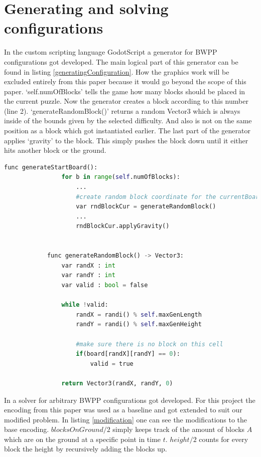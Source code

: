 \documentclass[runningheads]{llncs}
\begin{document}
    \section{Generating and solving configurations}
        In the custom scripting language GodotScript a generator for BWPP configurations got developed.
        The main logical part of this generator can be found in listing \ref{generatingConfiguration}.
        How the graphics work will be excluded entirely from this paper because it would go beyond the scope of this paper. \newline
        `self.numOfBlocks' tells the game how many blocks should be placed in the current puzzle. 
        Now the generator creates a block according to this number (line 2).
        `generateRandomBlock()' returns a random Vector3 which is always inside of the bounds given by the selected difficulty.
        And also is not on the same position as a block which got instantiated earlier.\newline
        The last part of the generator applies `gravity' to the block.
        This simply pushes the block down until it either hits another block or the ground.

        \begin{lstlisting}[caption=Generating configuration, label=generatingConfiguration, language=python]
            func generateStartBoard():   
                for b in range(self.numOfBlocks):
                    ... 
                    #create random block coordinate for the currentBoard
                    var rndBlockCur = generateRandomBlock() 
                    ...
                    rndBlockCur.applyGravity()


            func generateRandomBlock() -> Vector3:
                var randX : int
                var randY : int
                var valid : bool = false

                while !valid:
                    randX = randi() % self.maxGenLength
                    randY = randi() % self.maxGenHeight
                    
                    #make sure there is no block on this cell
                    if(board[randX][randY] == 0):
                        valid = true

                return Vector3(randX, randY, 0)
        \end{lstlisting}
           
        In \cite{originalEncodingPaper} a solver for arbitrary BWPP configurations got developed.
        For this project the encoding from this paper was used as a baseline and got extended to suit our modified problem.
        In listing \ref{modification} one can see the modifications to the base encoding.\newline
        $blocksOnGround/2$ simply keeps track of the amount of blocks $A$ which are on the ground at a specific point in time $t$.
        $height/2$ counts for every block the height by recursively adding the blocks up.
\end{document}
